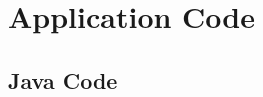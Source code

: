 
\chapter{Application Code}
\label{chap:code}

\section{Java Code}
\label{sec:javacode}


%

%


%

%




